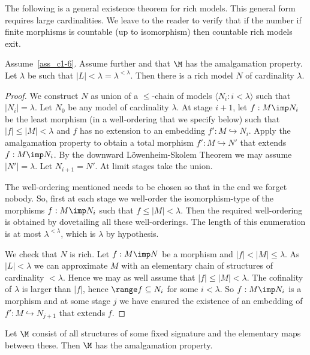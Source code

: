 The following is a general existence theorem for rich models.
This general form requires large cardinalities.
We leave to the reader to verify that if the number if finite morphisms is countable (up to isomorphism) then countable rich models exit.

\begin{theorem}  Assume~\ref{ass_c1-6}.
Assume further  and that $\M$ has the amalgamation property.
Let $\lambda$ be such that $|L|<\lambda=\lambda^{<\lambda}$.
Then there is a rich model $N$ of cardinality $\lambda$.
\end{theorem}

\begin{proof} We construct $N$ as union of a $\le$-chain of models $\langle N_i:i < \lambda\rangle$ such that $|N_i| = \lambda$.
Let $N_0$ be any model of cardinality $\lambda$.
At stage $i+1$, let $f:M\imp N_i$ be the least morphism (in a well-ordering that we specify below) such that $|f|\le|M|<\lambda$ and $f$ has no extension to an embedding $f':M\hookrightarrow N_i$.
Apply the amalgamation property to obtain a total morphism $f':M\hookrightarrow N'$ that extends $f:M\imp N_i$.
By the downward L\"owenheim-Skolem Theorem we may assume $|N'|=\lambda$.
Let $N_{i+1}=N'$.
At limit stages take the union.

The well-ordering mentioned needs to be chosen so that in the end we forget nobody.
So, first at each stage we well-order the isomorphism-type of the morphisms $f:M\imp N_i$ such that  $f\le|M|<\lambda$.
Then the required well-ordering is obtained by dovetailing all these well-orderings.
The length of this enumeration is at most $\lambda^{<\lambda}$, which is $\lambda$ by hypothesis.

We check that $N$ is rich.
Let $f:M\imp N$ be a morphism and $|f|<|M|\le\lambda$.
As $|L|<\lambda$ we can approximate $M$ with an elementary chain of structures of cardinality $<\lambda$.
Hence we may as well assume that $|f|\le|M|<\lambda$.
The cofinality of $\lambda$ is larger than $|f|$, hence $\range f\subseteq N_i$ for some $i<\lambda$.
So $f:M\imp N_i$ is a morphism and at some stage $j$ we have ensured the existence of an embedding of $f':M\hookrightarrow N_{j+1}$ that extends $f$.
\end{proof}

\begin{proposition}\label{prop_elementary_amalg}
Let $\M$ consist of all structures of some fixed signature and the elementary maps between these.
Then $\M$ has the amalgamation property.
\end{proposition}

